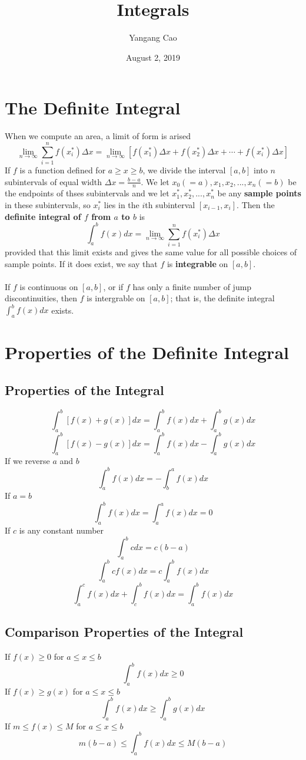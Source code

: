 \documentclass[10pt,a4paper,oneside]{article}
\author{Yangang Cao}
\date{August 2, 2019}
\title{Integrals}
\newcommand{\watermark}[3]{\AddToShipoutPictureBG{
		\parbox[b][\paperheight]{\paperwidth}{
			\vfill%
			\centering%
			\tikz[remember picture, overlay]%
			\node [rotate = #1, scale = #2] at (current page.center)%
			{\textcolor{gray!70!cyan!40!red!20}{#3}};
			\vfill}}}
\begin{document}
\maketitle
\tableofcontents

\newpage
\section{The Definite Integral}
When we compute an area, a limit of form is arised
\[
\lim\limits_{n\rightarrow\infty}\sum_{i=1}^{n}f(x^*_i)\Delta x=\lim\limits_{n\rightarrow\infty}[f(x^*_1)\Delta x+f(x^*_2)\Delta x+\cdots+f(x^*_i)\Delta x]
\]
If $f$ is a function defined for $a\geqslant x\geqslant b$, we divide the interval $[a,b]$ into $n$ subintervals of equal width $\Delta x = \frac{b-a}{n}$. We let $x_0(=a),x_1,x_2,...,x_n(=b)$ be the endpoints of thses subintervals and we let $x_1^*,x_2^*,...,x_n^*$ be any {\bfseries sample points} in these subintervals, so $x_i^*$ lies in the $i$th subinterval $[x_{i-1},x_i]$. Then the {\bfseries definite integral of $f$ from $a$ to $b$} is
\[
\int_{a}^{b}f(x)dx=\lim\limits_{n\rightarrow\infty}\sum_{i=1}^{n}f(x^*_i)\Delta x
\]
provided that this limit exists and gives the same value for all possible choices of sample points. If it does exist, we say that $f$ is {\bfseries integrable} on $[a,b]$.\\
\\If $f$ is continuous on $[a,b]$, or if $f$ has only a finite number of jump discontinuities, then $f$ is intergrable on $[a,b]$; that is, the definite integral $\int_{a}^{b}f(x)dx$ exists.
\section{Properties of the Definite Integral}
\subsection{Properties of the Integral}
\[
\int_{a}^{b}[f(x)+g(x)]dx=\int_{a}^{b}f(x)dx+\int_{a}^{b}g(x)dx
\]
\[
\int_{a}^{b}[f(x)-g(x)]dx=\int_{a}^{b}f(x)dx-\int_{a}^{b}g(x)dx
\]
If we reverse $a$ and $b$
\[
\int_{a}^{b}f(x)dx=-\int_{b}^{a}f(x)dx
\]
If $a=b$
\[
\int_{a}^{b}f(x)dx=\int_{a}^{a}f(x)dx=0
\]
If $c$ is any constant number
\[
\int_{a}^{b}cdx=c(b-a)
\]
\[
\int_{a}^{b}cf(x)dx=c\int_{a}^{b}f(x)dx
\]
\[
\int_{a}^{c}f(x)dx+\int_{c}^{b}f(x)dx=\int_{a}^{b}f(x)dx
\]
\subsection{Comparison Properties of the Integral}
If $f(x)\geqslant0$ for $a\leqslant x\leqslant b$
\[
\int_{a}^{b}f(x)dx\geqslant 0
\]
If $f(x)\geqslant g(x)$ for $a\leqslant x\leqslant b$
\[
\int_{a}^{b}f(x)dx\geqslant\int_{a}^{b}g(x)dx
\]
If $m\leqslant f(x)\leqslant M$ for $a\leqslant x\leqslant b$
\[
m(b-a)\leqslant\int_{a}^{b}f(x)dx\leqslant M(b-a)
\]
\end{document}
